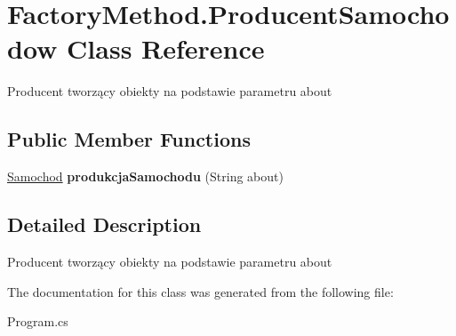 \hypertarget{class_factory_method_1_1_producent_samochodow}{}\section{Factory\+Method.\+Producent\+Samochodow Class Reference}
\label{class_factory_method_1_1_producent_samochodow}


Producent tworzący obiekty na podstawie parametru about  


\subsection*{Public Member Functions}
\begin{DoxyCompactItemize}
\item 
\mbox{\label{class_factory_method_1_1_producent_samochodow_a7339b0496f91acf51a421da86d5fadb7}} 
\hyperlink{class_factory_method_1_1_samochod}{Samochod} {\bfseries produkcja\+Samochodu} (String about)
\end{DoxyCompactItemize}


\subsection{Detailed Description}
Producent tworzący obiekty na podstawie parametru about 



The documentation for this class was generated from the following file\+:\begin{DoxyCompactItemize}
\item 
Program.\+cs\end{DoxyCompactItemize}
